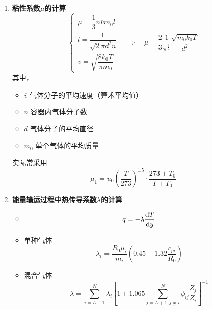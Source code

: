 \begin{enumerate}[\hspace*{1.5em} (1) ]
	\item \textbf{粘性系数$\mu$的计算}
	\begin{equation}
		\begin{cases}
			\, \mu = \dfrac{1}{3}n \overline{v}m_0l\\[0.5em]
			\, l = \dfrac{1}{\sqrt{2} \pi d^2 n}\\[1em]
			\, \overline{v} = \sqrt{\dfrac{8k_0T}{\pi m_0}}
		\end{cases}
		\quad \Rightarrow \quad \mu = \dfrac{2}{3}\dfrac{1}{\pi^{\textstyle \frac{3}{2}}}\dfrac{\sqrt{m_0k_0T}}{d^2}
	\end{equation}
	其中，\vspace*{-1em}
	\begin{itemize}
		\item $\overline{v}$ \quad 气体分子的平均速度（算术平均值）\vspace*{-0.5em}
		\item $n$ \quad 容器内气体分子数\vspace*{-0.5em}
		\item $d$ \quad 气体分子的平均直径\vspace*{-0.5em}
		\item $m_0$ \quad 单个气体的平均质量\vspace*{-0.5em}
	\end{itemize}
	实际常采用
	\begin{equation}
		\mu_1 = u_0 \left(\dfrac{T}{273}\right)^{1.5} \cdot \dfrac{273 + T_0}{T + T_0}
	\end{equation}
	
	\item \textbf{能量输运过程中热传导系数$\lambda$的计算}\vspace*{-1em}
	\begin{itemize}
		\item {}
		\begin{equation}
			q = - \lambda \dfrac{{\rm{d}} T}{{\rm{d}} y}
		\end{equation}
		\item 单种气体
		\begin{equation}
			\lambda_i = \dfrac{R_0\mu_i}{m_i}\left(0.45 + 1.32 \dfrac{c_{pi}}{R_0}\right)
		\end{equation}
		\item 混合气体
		\begin{equation}
			\lambda = \sum_{i = L +1}^{N} \lambda_i \left[ {\displaystyle 1 + 1.065 \sum_{j =L+1, j \neq i}^{N} \phi_{ij}\dfrac{Z_j}{Z_i}}\right]^{-1}
		\end{equation}
	\end{itemize}
\end{enumerate}

